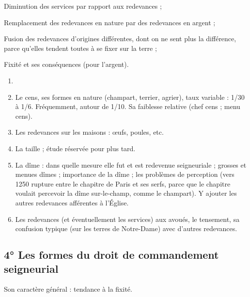 \documentclass[french,twoside]{book} %
\begin{document}
\begin{listalpha}[itemsep=0pt,]
\item[] \hspace{-1.5em}{\bfseries Quelques tendances :}
\item Diminution des services par rapport aux redevances ;
\item Remplacement des redevances en nature par des redevances en argent ;
\item Fusion des redevances d’origines différentes, dont on ne sent plus la différence, parce qu’elles tendent toutes à se fixer sur la terre ;
\item Fixité et ses conséquences (pour l’argent).

\end{listalpha}
\begin{enumerate}[itemsep=0pt,]
\item[] \hspace{-1.5em}{\bfseries Essai de classement des principales redevances :}
\item Le cens, ses formes en nature (champart, terrier, agrier), taux variable : 1/30 à 1/6. Fréquemment, autour de 1/10. Sa faiblesse relative (chef cens ; menu cens).
\item Les redevances sur les maisons : œufs, poules, etc.
\item La taille ; étude réservée pour plus tard.
\item La dîme : dans quelle mesure elle fut et est redevenue seigneuriale ; grosses et menues dîmes ; importance de la dîme ; les problèmes de perception (vers 1250 rupture entre le chapitre de Paris et ses serfs, parce que le chapitre voulait percevoir la dîme sur-le-champ, comme le champart). Y ajouter les autres redevances afférentes à l’Église.  
\label{p58}
\item Les redevances (et éventuellement les services) aux avoués, le tensement, sa confusion typique (sur les terres de Notre-Dame) avec d’autres redevances.

\end{enumerate}\subsection[4° Les formes du droit de commandement seigneurial]{4° Les formes du droit de commandement seigneurial}
\noindent Son caractère général : tendance à la fixité.\par
\end{document}
